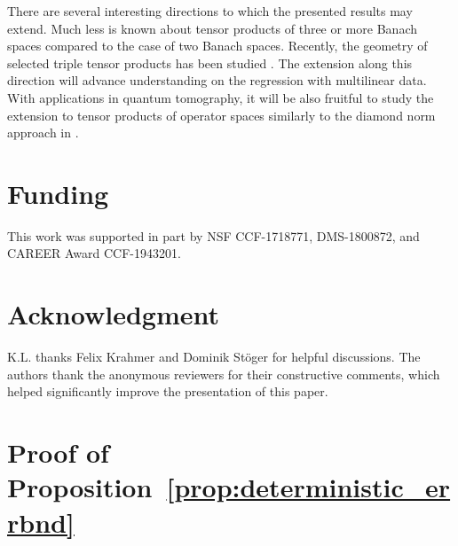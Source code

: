 \documentclass[11pt]{article}
\begin{document}
There are several interesting directions to which the presented results may extend. 
Much less is known about tensor products of three or more Banach spaces compared to the case of two Banach spaces. 
Recently, the geometry of selected triple tensor products has been studied \citep{giladi2017geometry}. 
The extension along this direction will advance understanding on the regression with multilinear data. 
With applications in quantum tomography, it will be also fruitful to study the extension to tensor products of operator spaces similarly to the diamond norm approach in \citep{kliesch2016improving}.


\section*{Funding}
This work was supported in part by NSF CCF-1718771, DMS-1800872, and CAREER Award CCF-1943201. 

\section*{Acknowledgment}
K.L. thanks Felix Krahmer and Dominik St\"oger for helpful discussions. 
The authors thank the anonymous reviewers for their constructive comments, which helped significantly improve the presentation of this paper. 


\appendix

\section{Proof of Proposition~\ref{prop:deterministic_errbnd}}
\label{sec:proof:prop:deterministic_errbnd}
\end{document}

